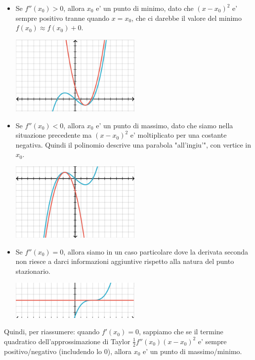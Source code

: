 \documentclass{report}
\begin{document}
\begin{itemize}
  \item Se $ f''(x_0) > 0 $, allora $ x_0 $ e' un punto di minimo, dato che $ (x-x_0)^2 $ e' sempre positivo tranne quando $ x = x_0 $, che ci darebbe il valore del minimo $ f(x_0) \approx f(x_0) + 0 $.
    \begin{center}
      \includegraphics[width=0.5\textwidth]{img/2024-05-10-12-37-28.png}
    \end{center}
  \item Se $ f''(x_0) < 0 $, allora $ x_0 $ e' un punto di massimo, dato che siamo nella situazione precedente ma $ (x-x_0)^2 $ e' moltiplicato per una costante negativa. Quindi il polinomio descrive una parabola "all'ingiu'", con vertice in $ x_0 $.
    \begin{center}
      \includegraphics[width=0.5\textwidth]{img/2024-05-10-12-38-04.png}
    \end{center}
  \item Se $ f''(x_0) = 0 $, allora siamo in un caso particolare dove la derivata seconda non riesce a darci informazioni aggiuntive rispetto alla natura del punto stazionario.
  \begin{center}
    \includegraphics[width=0.5\textwidth]{img/2024-05-10-12-38-41.png}
  \end{center}
\end{itemize}
Quindi, per riassumere: quando $ f'(x_0) = 0 $, sappiamo che se il termine quadratico dell'approssimazione di Taylor $ \frac{1}{2}f''(x_0)(x-x_0)^2 $ e' sempre positivo/negativo (includendo lo 0), allora $ x_0 $ e' un punto di massimo/minimo.
\end{document}
